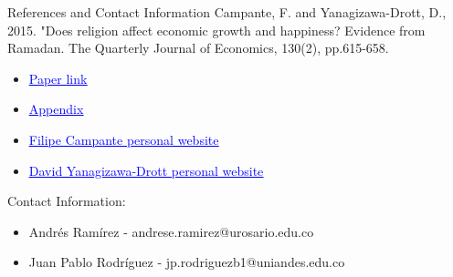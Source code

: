 \documentclass[pdftex,12pt,xcolor=pdftex,table]{beamer}
\begin{document}
\begin{frame}{References and Contact Information}
    Campante, F. and Yanagizawa-Drott, D., 2015. "Does religion affect economic growth and happiness? Evidence from Ramadan. The Quarterly Journal of Economics, 130(2), pp.615-658.
    \begin{itemize}
        \item \href{http://qje.oxfordjournals.org/content/130/2/615.full.pdf+html}{\textcolor{blue}{\underline{Paper link}}}
        \item \href{https://yanagizawadrott.com/wp-content/uploads/2016/02/rwandadyd_appendix_aug2014.pdf}{\textcolor{blue}{\underline{Appendix}}}
        \item \href{https://sites.google.com/view/prof-filipe-campante/home}{\textcolor{blue}{\underline{Filipe Campante personal website}}}
        \item \href{https://yanagizawadrott.com/}{\textcolor{blue}{\underline{David Yanagizawa-Drott personal website}}}
      \end{itemize}
    Contact Information:
    \begin{itemize}
        \item Andrés Ramírez - andrese.ramirez@urosario.edu.co
        \item Juan Pablo Rodríguez - jp.rodriguezb1@uniandes.edu.co
    \end{itemize}
        
    
\end{frame}
\end{document}
